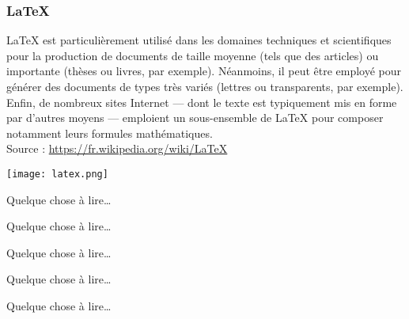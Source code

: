 \documentclass[envcountsect]{cs-mpi-slides}
\begin{document}
\begin{frame}[fragile]
\frametitle{\LaTeX{}}
\LaTeX{} est particulièrement utilisé dans les domaines techniques et scientifiques pour la production de documents de taille moyenne (tels que des articles) ou importante (thèses ou livres, par exemple). Néanmoins, il peut être employé pour générer des documents de types très variés (lettres ou transparents, par exemple). Enfin, de nombreux sites Internet — dont le texte est typiquement mis en forme par d’autres moyens — emploient un sous-ensemble de LaTeX pour composer notamment leurs formules mathématiques.
\\[2mm]
Source : \url{https://fr.wikipedia.org/wiki/LaTeX}
\begin{center}
\texttt{[image: latex.png]}
\end{center}
\end{frame}
\begin{frame}[fragile]
%
\begin{defn}
Quelque chose à lire\dots
\end{defn}
%
\begin{thm}
Quelque chose à lire\dots
\end{thm}
%
\begin{defn}
Quelque chose à lire\dots
\end{defn}
%
\begin{thm}
Quelque chose à lire\dots
\end{thm}
%
\begin{thm}[théorème]
Quelque chose à lire\dots
\end{thm}
%
%
%
\end{frame}
\end{document}
